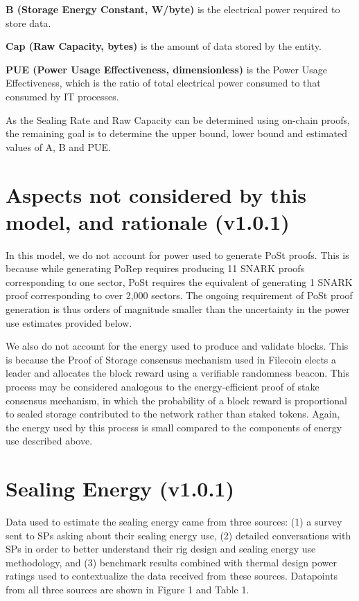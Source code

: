 \documentclass[9pt, oneside]{article}   	%
\begin{document}
\begin{multicols}{2}
\textbf{B (Storage Energy Constant, W/byte)} is the electrical power required to store data.

\textbf{Cap (Raw Capacity, bytes)} is the amount of data stored by the entity.

\textbf{PUE (Power Usage Effectiveness, dimensionless)} is the Power Usage Effectiveness, which is the ratio of total electrical power consumed to that consumed by IT processes.

As the Sealing Rate and Raw Capacity can be determined using on-chain proofs, the remaining goal is to determine the upper bound, lower bound and estimated values of A, B and PUE.

\section{Aspects not considered by this model, and rationale (v1.0.1)}

In this model, we do not account for power used to generate PoSt proofs. This is because while generating PoRep requires producing 11 SNARK proofs corresponding to one sector, PoSt requires the equivalent of generating 1 SNARK proof corresponding to over 2,000 sectors. The ongoing requirement of PoSt proof generation is thus orders of magnitude smaller than the uncertainty in the power use estimates provided below.

We also do not account for the energy used to produce and validate blocks. This is because the Proof of Storage consensus mechanism used in Filecoin elects a leader and allocates the block reward using a verifiable randomness beacon. This process may be considered analogous to the energy-efficient proof of stake consensus mechanism, in which the probability of a block reward is proportional to sealed storage contributed to the network rather than staked tokens. Again, the energy used by this process is small compared to the components of energy use described above.

\section{Sealing Energy (v1.0.1)}

Data used to estimate the sealing energy came from three sources: (1) a survey sent to SPs asking about their sealing energy use, (2) detailed conversations with SPs in order to better understand their rig design and sealing energy use methodology, and (3) benchmark results combined with thermal design power ratings used to contextualize the data received from these sources. Datapoints from all three sources are shown in Figure 1 and Table 1.


\end{multicols}
\end{document}

